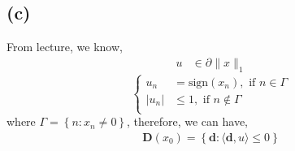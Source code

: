 \documentclass[12pt, a4 paper]{article}
\begin{document}
\begin{framed}
        \subsection{(c)}
        From lecture, we know,
        \begin{align}
            u &\in  \partial \lVert x \rVert_{1}
        \end{align}
        \begin{equation}
            \left\{
                \begin{aligned}
                u_{n} & = \text{sign}(x_{n}), \text{ if } n \in \Gamma  \\
                \lvert u_{n} \rvert & \leq 1, \text{ if } n \notin \Gamma \\
                \end{aligned}
                \right.
        \end{equation}
        \indent where $\Gamma = \left\{n: x_{n} \neq 0 \right\}$, therefore, we 
        can have,
        \begin{align}
            \mathbf{D}(x_{0}) = \left\{ \mathbf{d}:
            \langle \mathbf{d}, u\rangle \leq 0 \right\}
        \end{align}
        

    \end{framed}
\end{document}
